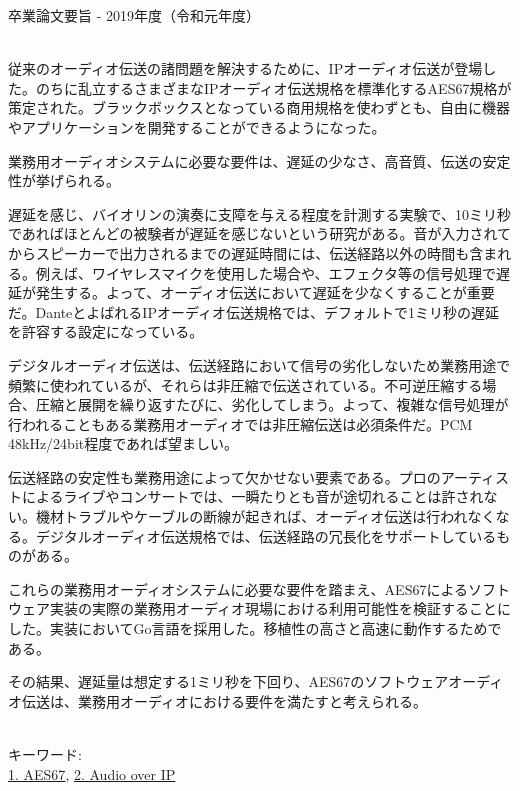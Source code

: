 卒業論文要旨 - 2019年度（令和元年度）
\begin{center}
\begin{large}
\end{large}
\end{center}

~ \\

従来のオーディオ伝送の諸問題を解決するために、IPオーディオ伝送が登場した。のちに乱立するさまざまなIPオーディオ伝送規格を標準化するAES67規格が策定された。ブラックボックスとなっている商用規格を使わずとも、自由に機器やアプリケーションを開発することができるようになった。

業務用オーディオシステムに必要な要件は、遅延の少なさ、高音質、伝送の安定性が挙げられる。

遅延を感じ、バイオリンの演奏に支障を与える程度を計測する実験で、10ミリ秒であればほとんどの被験者が遅延を感じないという研究がある。音が入力されてからスピーカーで出力されるまでの遅延時間には、伝送経路以外の時間も含まれる。例えば、ワイヤレスマイクを使用した場合や、エフェクタ等の信号処理で遅延が発生する。よって、オーディオ伝送において遅延を少なくすることが重要だ。DanteとよばれるIPオーディオ伝送規格では、デフォルトで1ミリ秒の遅延を許容する設定になっている。

デジタルオーディオ伝送は、伝送経路において信号の劣化しないため業務用途で頻繁に使われているが、それらは非圧縮で伝送されている。不可逆圧縮する場合、圧縮と展開を繰り返すたびに、劣化してしまう。よって、複雑な信号処理が行われることもある業務用オーディオでは非圧縮伝送は必須条件だ。PCM 48kHz/24bit程度であれば望ましい。

伝送経路の安定性も業務用途によって欠かせない要素である。プロのアーティストによるライブやコンサートでは、一瞬たりとも音が途切れることは許されない。機材トラブルやケーブルの断線が起きれば、オーディオ伝送は行われなくなる。デジタルオーディオ伝送規格では、伝送経路の冗長化をサポートしているものがある。

これらの業務用オーディオシステムに必要な要件を踏まえ、AES67によるソフトウェア実装の実際の業務用オーディオ現場における利用可能性を検証することにした。実装においてGo言語を採用した。移植性の高さと高速に動作するためである。

その結果、遅延量は想定する1ミリ秒を下回り、AES67のソフトウェアオーディオ伝送は、業務用オーディオにおける要件を満たすと考えられる。

~ \\
キーワード:\\
\underline{1. AES67},
\underline{2. Audio over IP}
\begin{flushright}
\dept \\
\author
\end{flushright}
